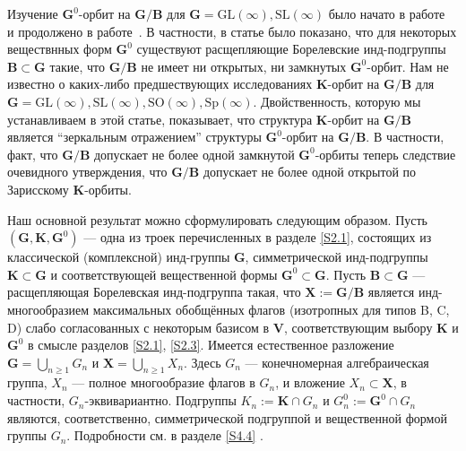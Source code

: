 \documentclass{amsart}
\theoremstyle{definition}
\begin{document}
 Изучение $\mathbf{G}^0$-орбит на $\mathbf{G}/\mathbf{B}$ для $\mathbf{G}=\mathrm{GL}(\infty),\mathrm{SL}(\infty)$ было начато в работе~\cite{Ignatyev-Penkov-Wolf} и  продолжено в работе~\cite{W}.  В частности, в статье \cite{Ignatyev-Penkov-Wolf} было показано, что для некоторых веществнных форм $\mathbf{G}^0$ существуют расщепляющие Борелевские инд-подгруппы $\mathbf{B}\subset \mathbf{G}$ такие, что $\mathbf{G}/\mathbf{B}$ не имеет ни открытых, ни замкнутых  $\mathbf{G}^0$-орбит.  %
Нам не известно о каких-либо предшествующих исследованиях    $\mathbf{K}$-орбит на $\mathbf{G}/\mathbf{B}$ для $\mathbf{G}=\mathrm{GL}(\infty),\mathrm{SL}(\infty),\mathrm{SO}(\infty),\mathrm{Sp}(\infty)$.  Двойственность, которую мы устанавливаем в этой статье, показывает, что структура $\mathbf{K}$-орбит на $\mathbf{G}/\mathbf{B}$ является ``зеркальным отражением'' структуры $\mathbf{G}^0$-орбит на $\mathbf{G}/\mathbf{B}$.  В частности, факт, что $\mathbf{G}/\mathbf{B}$ допускает не более одной замкнутой $\mathbf{G}^0$-орбиты теперь следствие очевидного утверждения, что $\mathbf{G}/\mathbf{B}$ допускает не более одной открытой по Зарисскому $\mathbf{K}$-орбиты.  %


Наш основной результат можно сформулировать следующим образом.
Пусть $(\mathbf{G},\mathbf{K},\mathbf{G}^0)$ --- одна из троек
перечисленных в разделе \ref{S2.1},
состоящих из классической (комплексной)
инд-группы $\mathbf{G}$, симметрической инд-подгруппы $\mathbf{K}\subset\mathbf{G}$
и соответствующей вещественной формы $\mathbf{G}^0\subset\mathbf{G}$.
Пусть $\mathbf{B}\subset\mathbf{G}$ --- расщепляющая Борелевская инд-подгруппа
такая, что $\mathbf{X}:=\mathbf{G}/\mathbf{B}$ является инд-многообразием максимальных обобщённых флагов (изотропных для типов B, C, D)
слабо согласованных с некоторым базисом в $\textbf{V} $, соответствующим
выбору $\mathbf{K}$ и $\mathbf{G}^0$ в смысле разделов \ref{S2.1}, \ref{S2.3}.
Имеется естественное разложение $\mathbf{G}=\bigcup_{n\geq 1}G_n$
и $\mathbf{X}=\bigcup_{n\geq 1}X_n$.
Здесь $G_n$ --- конечномерная алгебраическая группа,
$X_n$ --- полное многообразие флагов  в $G_n$,
и вложение $X_n\subset\mathbf{X}$, в частности, $G_n$-эквивариантно.
Подгруппы $K_n:=\mathbf{K}\cap G_n$ и $G^0_n:=\mathbf{G}^0\cap G_n$
являются, соответственно, симметрической подгруппой и вещественной формой группы $G_n$.
Подробности см. в разделе  \ref{S4.4}  .
\end{document}
